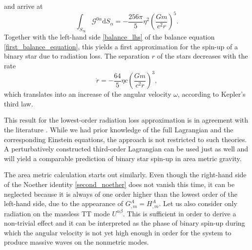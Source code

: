 and arrive at
\begin{equation}
  \int_{S_\infty}\mathcal G^{0\alpha}\mathrm dS_\alpha = -\frac{256\pi}{5}\eta^2\left(\frac{Gm}{c^2r}\right)^5.
\end{equation}
Together with the left-hand side \eqref{balance_lhs} of the balance equation \eqref{first_balance_equation}, this yields a first approximation for the spin-up of a binary star due to radiation loss. The separation $r$ of the stars decreases with the rate
\begin{equation}
  \dot r = -\frac{64}{5}\eta c\left(\frac{Gm}{c^2r}\right)^3,
\end{equation}
which translates into an increase of the angular velocity $\omega$, according to Kepler's third law.

This result for the lowest-order radiation loss approximation is in agreement with the literature \cite{poisson2014gravity}. While we had prior knowledge of the full Lagrangian and the corresponding Einstein equations, the approach is not restricted to such theories. A perturbatively constructed third-order Lagrangian can be used just as well and will yield a comparable prediction of binary star spin-up in area metric gravity.

The area metric calculation starts out similarly. Even though the right-hand side of the Noether identity \eqref{second_noether} does not vanish this time, it can be neglected because it is always of one order higher than the lowest order of the left-hand side, due to the appearance of $G^A_{,m} = H^A_{,m}$. Let us also consider only radiation on the massless TT mode $U^{\alpha\beta}$. This is sufficient in order to derive a non-trivial effect and it can be interpreted as the phase of binary spin-up during which the angular velocity is not yet high enough in order for the system to produce massive waves on the nonmetric modes.

